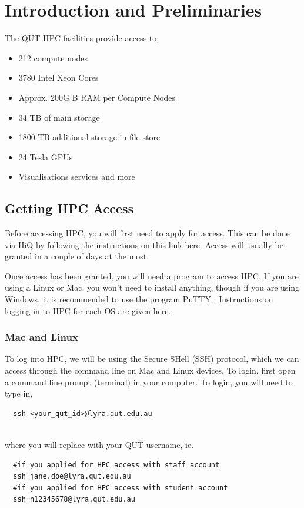 \section{Introduction and Preliminaries}
%
%
%
%
The QUT HPC facilities provide access to,
\begin{itemize}
\item 212 compute nodes
\item 3780 Intel Xeon Cores
\item Approx. 200G B RAM per Compute Nodes
\item 34 TB of main storage
\item 1800 TB additional storage in file store
\item 24 Tesla GPUs
\item Visualisations services and more
\end{itemize}
%
%
%
\subsection{Getting HPC Access}
Before accessing HPC, you will first need to apply for access. This can be done via HiQ by following the instructions on this link \href{https://qutvirtual4.qut.edu.au/group/research-students/doing-your-research/specialty-research-facilities/apply-for-a-hpc-account}{here}. Access will usually be granted in a couple of days at the most.
%
%
\par
%
%
Once access has been granted, you will need a program to access HPC. If you are using a Linux or Mac, you won't need to install anything, though if you are using Windows, it is recommended to use the program PuTTY \cite{putty}. Instructions on logging in to HPC for each OS are given here.
%
%
\subsubsection{Mac and Linux}
To log into HPC, we will be using the Secure SHell (SSH) protocol, which we can access through the command line on Mac and Linux devices. To login, first open a command line prompt (terminal) in your computer. To login, you will need to type in,
\\
\par
\begin{verbatim}
  ssh <your_qut_id>@lyra.qut.edu.au
\end{verbatim}
\\
where you will replace  with your QUT username, ie.
\\
\par
\begin{verbatim}
  #if you applied for HPC access with staff account
  ssh jane.doe@lyra.qut.edu.au
  #if you applied for HPC access with student account
  ssh n12345678@lyra.qut.edu.au
\end{verbatim}
%
%
%
%
